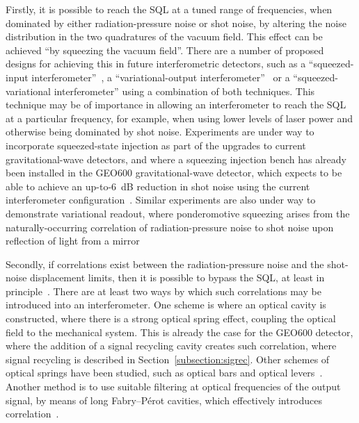 Firstly, it is possible to reach the SQL at a tuned range of frequencies, when
dominated by either radiation-pressure noise or shot noise, by altering the
noise distribution in the two quadratures of the vacuum field. This effect can
be achieved ``by squeezing the vacuum field''. There are a number of proposed
designs for achieving this in future interferometric detectors, such as a
``squeezed-input interferometer''~\cite{Caves2, Unruh:1983}, a
``variational-output interferometer''~\cite{Vyatchanin:1993} or a
``squeezed-variational interferometer'' using a combination of both techniques.
This technique may be of importance in allowing an interferometer to reach the
SQL at a particular frequency, for example, when using lower levels of laser
power and otherwise being dominated by shot noise. Experiments are under way to
incorporate squeezed-state injection as part of the upgrades to current
gravitational-wave detectors, and where a squeezing injection bench has already
been installed in the GEO600 gravitational-wave detector, which expects to be
able to achieve an up-to-6~dB reduction in shot noise using the current
interferometer configuration~\cite{Vahlbruch:2006}. Similar experiments are also
under way to demonstrate variational readout, where ponderomotive squeezing
arises from the naturally-occurring correlation of radiation-pressure noise to
shot noise upon reflection of light from a
mirror~\cite{Corbitt:2006, Sakata:2006}


Secondly, if correlations exist between the radiation-pressure noise and the
shot-noise displacement limits, then it is possible to bypass the SQL, at least
in principle~\cite{Loudon:1981}.  There are at least two ways by which such
correlations may be introduced into an interferometer.  One scheme is where an
optical cavity is constructed, where there is a strong optical spring effect,
coupling the optical field to the mechanical system.  This is already the case
for the GEO600 detector, where the addition of a signal recycling cavity creates
such correlation, where signal recycling is described in
Section~\ref{subsection:sigrec}. Other schemes of optical springs have been studied,
such as optical bars and optical levers~\cite{Braginsky:1996, Braginsky:1997}.
Another method is to use suitable filtering at optical frequencies of the
output signal, by means of long Fabry--P\'{e}rot cavities, which effectively
introduces correlation~\cite{Kimble:2001, Corbitt:2004}.